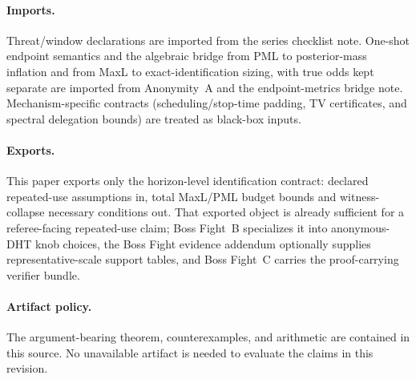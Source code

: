 \documentclass[11pt]{article}
\begin{document}
\paragraph{Imports.}
Threat/window declarations are imported from the series checklist note.\cite{series:threatwindows}
One-shot endpoint semantics and the algebraic bridge from PML to posterior-mass inflation and from MaxL to exact-identification sizing, with true odds kept separate are imported from Anonymity~A and the endpoint-metrics bridge note.\cite{series:oddsinflation,series:endpointbridge}
Mechanism-specific contracts (scheduling/stop-time padding, TV certificates, and spectral delegation bounds) are treated as black-box inputs.\cite{series:schedcompiler,series:knapsacktransport,series:prefixcapacities,series:manytestinglowerbounds,series:stoptimeaddendum,series:spectral}

\paragraph{Exports.}
This paper exports only the horizon-level identification contract: declared repeated-use assumptions in, total MaxL/PML budget bounds and witness-collapse necessary conditions out.
That exported object is already sufficient for a referee-facing repeated-use claim; Boss Fight~B specializes it into anonymous-DHT knob choices, the Boss Fight evidence addendum optionally supplies representative-scale support tables, and Boss Fight~C carries the proof-carrying verifier bundle.

\paragraph{Artifact policy.}
The argument-bearing theorem, counterexamples, and arithmetic are contained in this source. No unavailable artifact is needed to evaluate the claims in this revision.
\end{document}
